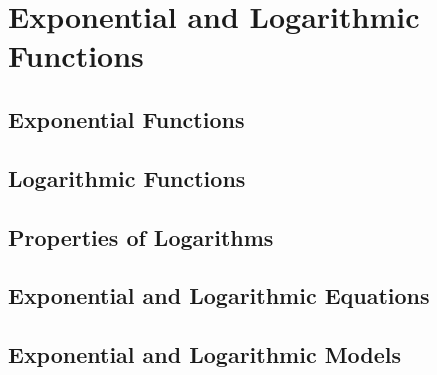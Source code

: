 
\chapter{Exponential and Logarithmic Functions}

\section{Exponential Functions}

\section{Logarithmic Functions}

\section{Properties of Logarithms}

\section{Exponential and Logarithmic Equations}

\section{Exponential and Logarithmic Models}










